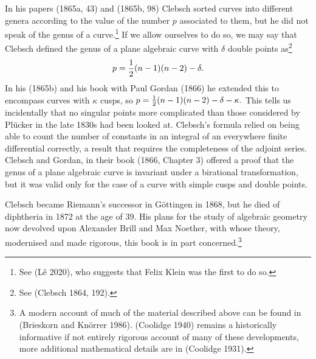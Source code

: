                                                                                                                                                                                                                                                                                                                                                                                                                                                                                                                                                                                                                                                                                                                                                                                                                                                                                                                                                                                                                                                                                                            
In his papers (1865a, 43) and (1865b, 98) Clebsch sorted curves into different genera according to the value of the number $p$ associated to them, but he did not speak of the genus of a curve.\footnote{See (L\^e 2020), who suggests that Felix Klein was the first to do so.} If we allow ourselves to do so, we may say that Clebsch defined the genus of a plane algebraic curve with $\delta$ double points as\footnote{See (Clebsch 1864, 192).} 
 \[p = \ha (n-1)(n-2) - \delta.\]
In his (1865b) and his book with Paul Gordan (1866) he extended this to encompass curves with 
$\kappa$ cusps, so $p= \ha (n-1)(n-2) - \delta - \kappa.$ This tells us incidentally that no singular points more complicated than those considered by Pl\"ucker in the late 1830s had been looked at. Clebsch's formula relied on being able to count the number of constants in an integral of an everywhere finite differential correctly, a result that requires the  completeness of the adjoint series. Clebsch and Gordan, in their book (1866, Chapter 3) offered a proof that the genus of a plane algebraic curve is invariant under a birational transformation, but it was valid only for the case of a curve with simple cusps and double points. 


Clebsch became   Riemann's successor in G\"ottingen in 1868, but  he died of diphtheria in 1872 at the age of 39. His plans for the study of algebraic geometry now devolved upon Alexander Brill and Max Noether, with whose theory, modernised and made rigorous,  this book is in part concerned.\footnote{A modern account of  much of the material described above can be found in (Brieskorn and Kn\"orrer 1986). (Coolidge 1940) remains a historically informative if not entirely rigorous account of many of these developments, more additional mathematical details are in (Coolidge 1931).}

